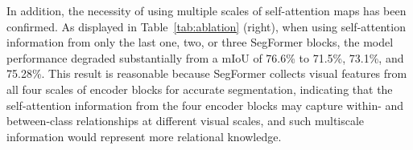 \documentclass[onecolumn,conference,compsoc]{IEEEtran}
\begin{document}
\begin{spacing}{1.5}
 {In addition,} the necessity of using multiple scales of self-attention maps  {has been} confirmed. As  {displayed in} Table~\ref{tab:ablation} (right), when using self-attention information from only the last one, two, or three SegFormer blocks, the model performance  {degraded} substantially from a mIoU of 76.6\% to 71.5\%, 73.1\%, and 75.28\%. This result is reasonable because SegFormer collects visual features from all four scales of encoder blocks for accurate segmentation,  {indicating} that the self-attention information from the four encoder blocks may capture within- and between-class relationships at different visual scales, and  {such multiscale} information would represent more relational knowledge.


\begin{table*}[tbp]
    \caption{\normalsize Ablation study of the proposed SATS. Left: effect of SATS components on continual learning with three VOC settings. Right: the necessity of using multiscale self-attention transfer. PL: pseudo-labeling. }
    \centering
    \small{
        }
\end{table*}
\end{spacing}
\end{document}
